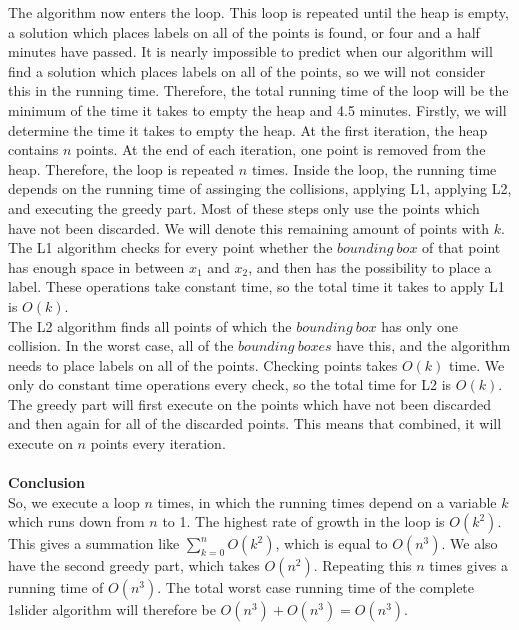 \documentclass[crop=false,a4paper,oneside,11pt]{article}
\begin{document}
The algorithm now enters the loop. This loop is repeated until the heap is empty, a solution which places labels on all of the points is found, or four and a half minutes have passed. It is nearly impossible to predict when our algorithm will find a solution which places labels on all of the points, so we will not consider this in the running time. Therefore, the total running time of the loop will be the minimum of the time it takes to empty the heap and 4.5 minutes. Firstly, we will determine the time it takes to empty the heap. At the first iteration, the heap contains $n$ points. At the end of each iteration, one point is removed from the heap. Therefore, the loop is repeated $n$ times. Inside the loop, the running time depends on the running time of assinging the collisions, applying L1, applying L2, and executing the greedy part. Most of these steps only use the points which have not been discarded. We will denote this remaining amount of points with $k$. \\ The L1 algorithm checks for every point whether the $bounding \ box$ of that point has enough space in between $x_1$ and $x_2$, and then has the possibility to place a label. These operations take constant time, so the total time it takes to apply L1 is $O(k)$. \\
The L2 algorithm finds all points of which the $bounding \ box$ has only one collision. In the worst case, all of the $bounding \ boxes$ have this, and the algorithm needs to place labels on all of the points. Checking points takes $O(k)$ time. We only do constant time operations every check, so the total time for L2 is $O(k)$. \\
The greedy part will first execute on the points which have not been discarded and then again for all of the discarded points. This means that combined, it will execute on $n$ points every iteration.  
\\ \\
\textbf{Conclusion} \\
So, we execute a loop $n$ times, in which the running times depend on a variable $k$ which runs down from $n$ to 1. The highest rate of growth in the loop is $O(k^2)$. This gives a summation like $\sum_{k=0}^n O(k^2)$, which is equal to $O(n^3)$. We also have the second greedy part, which takes $O(n^2)$. Repeating this $n$ times gives a running time of $O(n^3)$.
The total worst case running time of the complete 1slider algorithm will therefore be $O(n^3) + O(n^3) = O(n^3)$.
\end{document}
